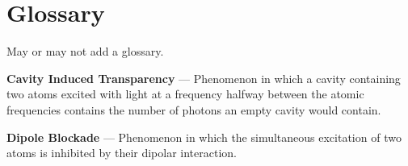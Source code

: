 \chapter*{Glossary} 


May or may not add a glossary.

\textbf{Cavity Induced Transparency} — Phenomenon in which a cavity containing two atoms excited with light at a frequency halfway between the atomic frequencies contains the number of photons an empty cavity would contain.  

\textbf{Dipole Blockade} — Phenomenon in which the simultaneous excitation of two atoms is inhibited by their dipolar interaction. 

